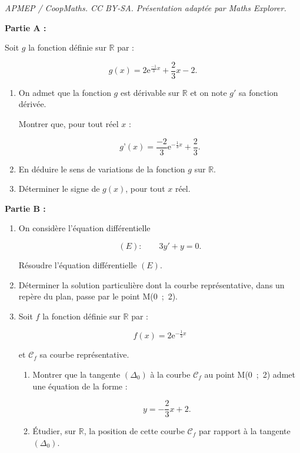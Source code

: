 \documentclass[10pt]{article}
\providecommand{\R}{\mathbb{R}}
\providecommand{\e}{{\mathrm{e}}}
\begin{document}
\noindent\textit{APMEP / CoopMaths. CC BY-SA. Présentation adaptée par Maths Explorer.}\par\medskip
\bigskip 

\textbf{Partie A :}

\medskip

Soit $g$ la fonction définie sur $\R$ par :

\[g(x) = 2\e^{\frac{-1}{3}x} + \dfrac{2}{3}x - 2.\]

\smallskip

\begin{enumerate}
\item On admet que la fonction $g$ est dérivable sur $\R$ et on note $g'$ sa fonction dérivée.

Montrer que, pour tout réel $x$ :

\[g’(x) = \dfrac{-2}{3}\text{e}^{- \frac{1}{3}x} + \dfrac{2}{3}.\]

\item En déduire le sens de variations de la fonction $g$ sur $\R$.
\item Déterminer le signe de $g(x)$, pour tout $x$ réel.
\end{enumerate}

\bigskip

\textbf{Partie B :}

\medskip

\begin{enumerate}
\item On considère l'équation différentielle

\[(E) :\qquad  3y' + y = 0.\]

Résoudre l'équation différentielle $(E)$.
\item Déterminer la solution particulière dont la courbe représentative, dans un repère du plan, passe par le point M(0~;~2).
\item Soit $f$ la fonction définie sur $\R$ par :

\[f(x) = 2\text{e}^{- \frac{1}{3}x}\]

et $\mathcal{C}_f$ sa courbe représentative.
	\begin{enumerate}
		\item Montrer que la tangente $\left(\Delta_0\right)$ à la courbe $\mathcal{C}_f$ au point M(0~;~2) admet une équation de la forme :

\[y= - \dfrac{2}{3}x + 2.\]

		\item Étudier, sur $\R$, la position de cette courbe 
$\mathcal{C}_f$ par rapport à la tangente
$\left(\Delta_0\right)$.
	\end{enumerate}
\end{enumerate}
\end{document}
